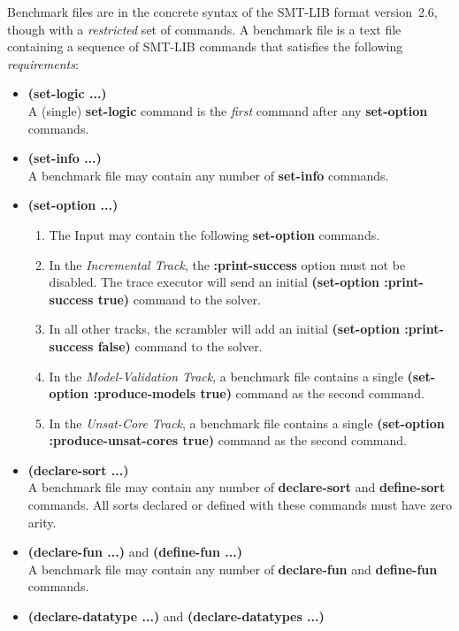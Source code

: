 \documentclass[12pt]{article}
\newcommand{\akey}[1]{\textbf{#1}\xspace}
\newcommand{\bkey}[1]{\textbf{{#1}}\xspace}
\newcommand{\inctrack}{Incremental Track\xspace}
\newcommand{\ucoretrack}{Unsat-Core Track\xspace}
\newcommand{\mvaltrack}{Model-Validation Track\xspace}
\begin{document}
Benchmark files are in the concrete syntax of the SMT-LIB format
version~2.6, though with a \emph{restricted} set of commands.  A benchmark
file is a text file containing a sequence of SMT-LIB commands that
satisfies the following \emph{requirements}:
%
\begin{itemize}
  \item \bkey{(set-logic ...)}\\
    A (single) \akey{set-logic} command is the \emph{first} command after
    any \akey{set-option} commands.
  \item \bkey{(set-info ...)}\\
    A benchmark file may contain any number of \akey{set-info} commands.
  \item
    \bkey{(set-option ...)}
    \begin{enumerate}[label=(\alph*)]
      \vspace{-1ex}
    \item The Input may contain the following \akey{set-option} commands.
    \item In the \emph{\inctrack}, the \akey{:print-success} option
      must not be disabled.  The trace executor will send an initial
      \akey{(set-option :print-success true)} command to the solver.
    \item In all other tracks, the scrambler will add an initial
      \akey{(set-option :print-success false)} command to the solver.
    \item In the \emph{\mvaltrack}, a benchmark file contains a single
      \akey{(set-option :produce-models true)} command as the second command.
    \item In the \emph{\ucoretrack}, a benchmark file contains a
      single \akey{(set-option :produce-unsat-cores true)} command as
      the second command.
    \end{enumerate}
  \item \bkey{(declare-sort ...)}\\
    A benchmark file may contain any number of \akey{declare-sort} and
    \akey{define-sort} commands.  All sorts declared or defined with these
    commands must have zero arity.
  \item \bkey{(declare-fun ...)} and \bkey{(define-fun ...)}\\
    A benchmark file may contain any number of \akey{declare-fun} and
    \akey{define-fun} commands.
  \item \bkey{(declare-datatype ...)} and \bkey{(declare-datatypes ...)}\\

\end{itemize}
\end{document}
